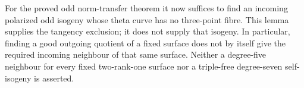 \begin{remark}
\label{rem:root-nonordinary-odd-theta-nodality-scope}
For the proved odd norm-transfer theorem it now suffices to find
an incoming polarized odd isogeny whose theta curve has no
three-point fibre. This lemma supplies the tangency exclusion;
it does not supply that isogeny. In particular, finding a good
outgoing quotient of a fixed surface does not by itself give
the required incoming neighbour of that same surface.
Neither a degree-five neighbour for every fixed two-rank-one
surface nor a triple-free degree-seven self-isogeny is asserted.
\end{remark}
